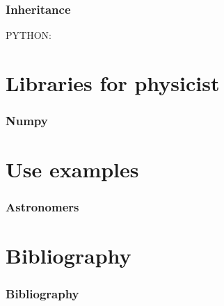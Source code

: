 \documentclass[14pt]{beamer}
\begin{document}
\begin{frame}
\frametitle{Inheritance}
PYTHON:

\end{frame}

\section{Libraries for physicist}

\begin{frame}
\frametitle{Numpy}
\end{frame}

\section{Use examples}

\begin{frame}
\frametitle{Astronomers}
\end{frame}

\appendix
\section{Bibliography}

\begin{frame}
\frametitle{Bibliography}
\end{frame}
\end{document}
